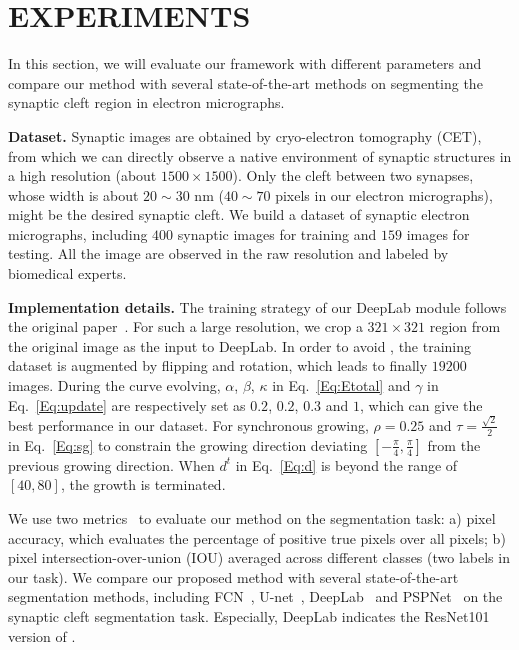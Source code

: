 \section{EXPERIMENTS}
\label{sec:experiments}
In this section, we will evaluate our framework with different parameters and compare our method with several state-of-the-art methods on segmenting the synaptic cleft region in electron micrographs.

\noindent\textbf{Dataset.}
Synaptic images are obtained by cryo-electron tomography (CET), from which we can directly observe a native environment of synaptic structures in a high resolution (about $1500\times 1500$).
%
Only the cleft between two synapses, whose width is about $20\sim30$ nm ($40\sim70$ pixels in our electron micrographs), might be the desired synaptic cleft.
%
We build a dataset of synaptic electron micrographs, including $400$ synaptic images for training and $159$ images for testing.
%
All the image are observed in the raw resolution and labeled by biomedical experts.

\noindent\textbf{Implementation details.}
The training strategy of our DeepLab module follows the original paper~\cite{Chen2016a}.
For such a large resolution, we crop a $321\times 321$ region from the original image as the input to DeepLab.
In order to avoid , the training dataset is augmented by flipping and rotation, which leads to finally $19200$ images.
%
During the curve evolving, $\alpha$, $\beta$, $\kappa$ in Eq.~\ref{Eq:Etotal} and $\gamma$ in Eq.~\ref{Eq:update} are respectively set as $0.2$, $0.2$, $0.3$ and $1$, which can give the best performance in our dataset.
For synchronous growing, $\rho=0.25$ and $\tau=\frac{\sqrt{2}}{2}$ in Eq.~\ref{Eq:sg} to constrain the growing direction deviating $[-\frac{\pi}{4},\frac{\pi}{4}]$ from the previous growing direction.
When $d^{t}$ in Eq.~\ref{Eq:d} is beyond the range of $[40,80]$, the growth is terminated.




We use two metrics~\cite{Cheng2017} to evaluate our method on the segmentation task:
a) pixel accuracy, which evaluates the percentage of positive true pixels over all pixels;
b) pixel intersection-over-union (IOU) averaged across different classes (two labels in our task).
%
We compare our proposed method with several state-of-the-art segmentation methods, including FCN~\cite{Long2015}, U-net~\cite{Ronneberger2015}, DeepLab~\cite{Chen2016a} and PSPNet~\cite{Zhao2016} on the synaptic cleft segmentation task.
Especially, DeepLab indicates the ResNet101 version of \cite{Chen2016a}.

